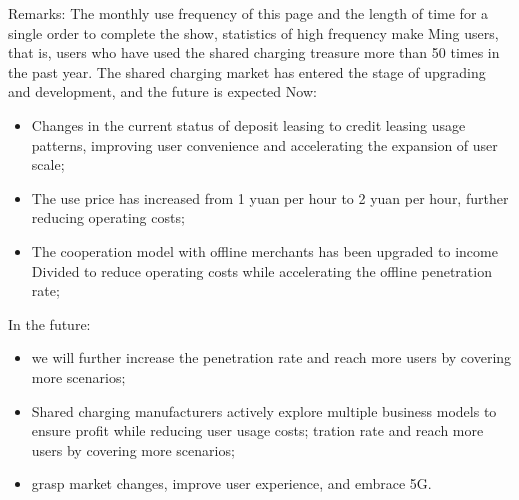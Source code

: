 \documentclass[12pt]{article}
\begin{document}
            \newpage
            Remarks: The monthly use frequency of this page and the length of time for a single order to complete the show, 
            statistics of high frequency make Ming users, that is, users who have used the shared charging treasure more than 50 times in the past year.
            The shared charging market has entered the stage of upgrading and development, and the future is expected
            \newline
                Now: 
                \begin{itemize}
                    \item Changes in the current status of deposit leasing to credit leasing usage patterns, 
                    improving user convenience and accelerating the expansion of user scale; 
                    \item The use price has increased from 1 yuan per hour to 2 yuan per hour, further reducing operating costs; 
                    \item The cooperation model with offline merchants has been upgraded to income 
                    Divided to reduce operating costs while accelerating the offline penetration rate;   
                \end{itemize}
                \newpage
                In the future:
                \begin{itemize}
                    \item we will further increase the penetration rate and reach more users by covering more scenarios; 
                    \item Shared charging manufacturers actively explore multiple business models to ensure profit while reducing user usage costs; 
                    tration rate and reach more users by covering more scenarios;
                    \item grasp market changes, improve user experience, and embrace 5G.
                \end{itemize}
\end{document}
